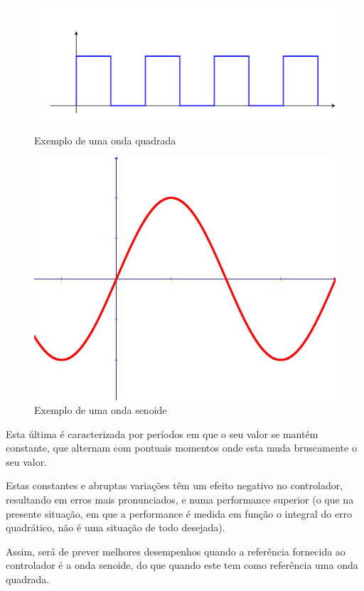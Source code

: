 \documentclass{article}
\begin{document}
\begin{figure}[H]
  \centering
      \includegraphics[scale=0.3]{Images/Squared_Wave.png}
  \caption{Exemplo de uma onda quadrada}
\end{figure}

\begin{figure}[H]
  \centering
      \includegraphics[scale=0.2]{Images/Sin_Wave.png}
  \caption{Exemplo de uma onda senoide}
\end{figure}

Esta última é caracterizada por períodos em que o seu valor se mantém constante, que alternam com pontuais momentos onde esta muda bruscamente o seu valor.

Estas constantes e abruptas variações têm um efeito negativo no controlador, resultando em erros mais pronunciados, e numa performance superior (o que na presente situação, em que a performance é medida em função o integral do erro quadrático, não é uma situação de todo desejada).

Assim, será de prever melhores desempenhos quando a referência fornecida ao controlador é a onda senoide, do que quando este tem como referência uma onda quadrada.
\end{document}
